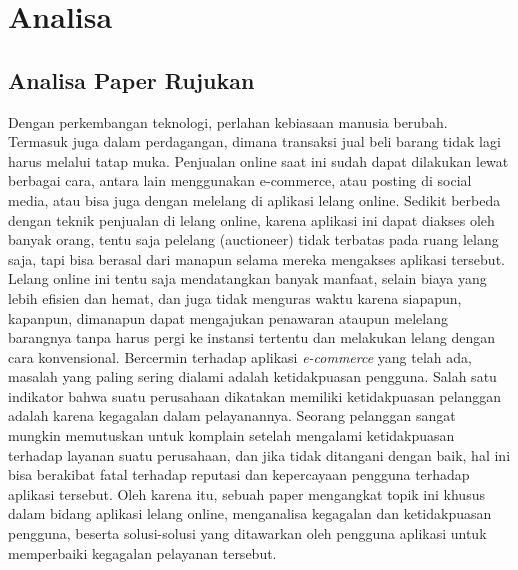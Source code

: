 \section{Analisa}
  
    \subsection{Analisa Paper Rujukan}
    Dengan perkembangan teknologi, perlahan kebiasaan manusia berubah. Termasuk juga dalam perdagangan, dimana transaksi jual beli barang tidak lagi harus melalui tatap muka. Penjualan online saat ini sudah dapat dilakukan lewat berbagai cara, antara lain menggunakan e-commerce, atau posting di social media, atau bisa juga dengan melelang di aplikasi lelang online. Sedikit berbeda dengan teknik penjualan di lelang online, karena aplikasi ini dapat diakses oleh banyak orang, tentu saja pelelang (auctioneer) tidak terbatas pada ruang lelang saja, tapi bisa berasal dari manapun selama mereka mengakses aplikasi tersebut.  Lelang online ini tentu saja mendatangkan banyak manfaat, selain biaya yang lebih efisien dan hemat, dan juga tidak menguras waktu karena siapapun, kapanpun, dimanapun dapat mengajukan penawaran ataupun melelang barangnya tanpa harus pergi ke instansi tertentu dan melakukan lelang dengan cara konvensional.
    Bercermin terhadap aplikasi \textit{e-commerce} yang telah ada, masalah yang paling sering dialami adalah ketidakpuasan pengguna. Salah satu indikator bahwa suatu perusahaan dikatakan memiliki ketidakpuasan pelanggan adalah karena kegagalan dalam pelayanannya. Seorang pelanggan sangat mungkin memutuskan untuk komplain setelah mengalami ketidakpuasan terhadap layanan suatu perusahaan, dan jika tidak ditangani dengan baik, hal ini bisa berakibat fatal terhadap reputasi dan kepercayaan pengguna terhadap aplikasi tersebut.
    Oleh karena itu, sebuah paper mengangkat topik ini khusus dalam bidang aplikasi lelang online, menganalisa kegagalan dan ketidakpuasan pengguna, beserta solusi-solusi yang ditawarkan oleh pengguna aplikasi untuk memperbaiki kegagalan pelayanan tersebut. 
